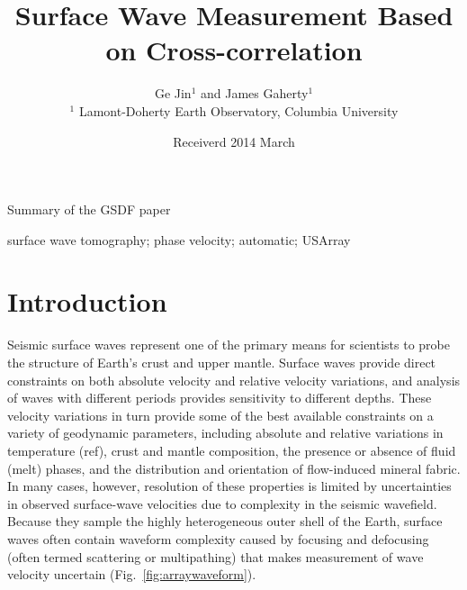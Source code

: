 \documentclass{gji}
\title[Surface Wave Measurement Based on Cross-correlation]
	{Surface Wave Measurement Based on Cross-correlation}
\author[Ge Jin and James Gaherty]
  {Ge Jin$^1$ and James Gaherty$^1$ \\
  $^1$ Lamont-Doherty Earth Observatory, Columbia University
  }
\date{Receiverd 2014 March}
\begin{document}
\label{firstpage}

\maketitle


\begin{summary}
	Summary of the GSDF paper
\end{summary}

\begin{keywords}
	 surface wave tomography; phase velocity; automatic; USArray
\end{keywords}

\section{Introduction}

Seismic surface waves represent one of the primary means for scientists to probe the structure of Earth's crust and upper mantle.  Surface waves provide direct constraints on both absolute velocity and relative velocity variations, and analysis of waves with different periods provides sensitivity to different depths.  These velocity variations in turn provide some of the best available constraints on a variety of geodynamic parameters, including absolute and relative variations in temperature (ref), crust and mantle composition, the presence or absence of fluid (melt) phases, and the distribution and orientation of flow-induced mineral fabric.  In many cases, however, resolution of these properties is limited by uncertainties in observed surface-wave velocities due to complexity in the seismic wavefield.  Because they sample the highly heterogeneous outer shell of the Earth, surface waves often contain waveform complexity caused by focusing and defocusing (often termed scattering or multipathing) that makes measurement of wave velocity uncertain (Fig.~\ref{fig:arraywaveform}). 
\end{document}
